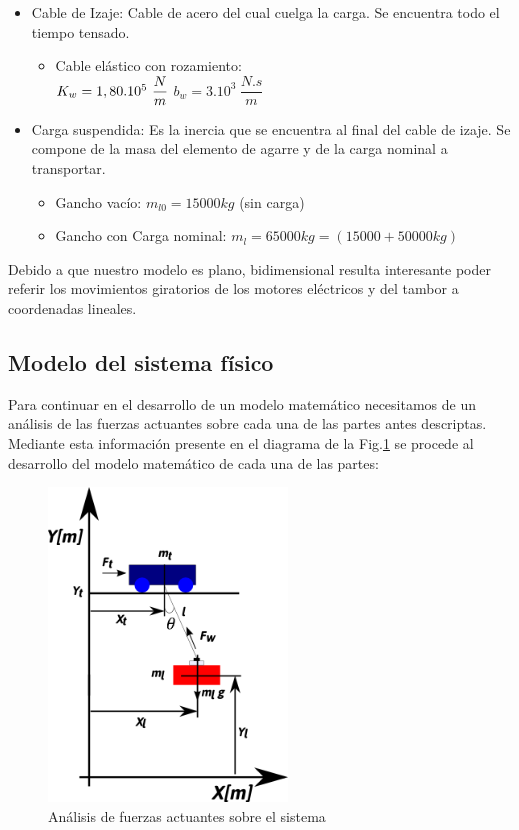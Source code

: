 \documentclass[journal]{IEEEtran}
\begin{document}
\begin{itemize}
 \item Cable de Izaje: Cable de acero del cual cuelga
 la carga. Se encuentra todo el tiempo tensado.
 \begin{itemize}
  \item Cable elástico con rozamiento:\\
  $K_w=1,80.10^5~\dfrac{N}{m}\\$
  $b_w=3.10^3~\dfrac{N.s}{m}$
 \end{itemize}

 \item Carga suspendida: Es la inercia que se encuentra
 al final del cable de izaje. Se compone de la masa del
 elemento de agarre y de la carga nominal a transportar.
 \begin{itemize}
  \item Gancho vacío: $m_{l0}=15000 kg$ (sin carga)
  \item Gancho con Carga nominal: $m_l=65000 kg=(15000 + 50000 kg)$
 \end{itemize}

\end{itemize}

Debido a que nuestro modelo es plano, bidimensional
resulta interesante poder referir los movimientos 
giratorios de los motores eléctricos y del tambor
a coordenadas lineales.
 
\subsection{Modelo del sistema físico}
Para continuar en el desarrollo de un modelo matemático
necesitamos de un análisis de las fuerzas actuantes sobre
cada una de las partes antes descriptas. Mediante esta 
información presente en el diagrama de la Fig.\ref{fig:ejes}
se procede al desarrollo del modelo matemático de cada una 
de las partes:


\begin{figure}[!t]
 \centering
  \includegraphics[width=2.5in]{trolley_carga.png}
  \caption{Análisis de fuerzas actuantes sobre el sistema}
  \label{fig:ejes}
\end{figure}
\end{document}

